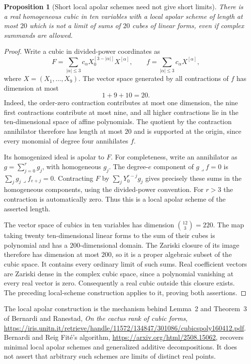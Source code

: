\documentclass[11pt]{article}
\newtheorem{proposition}{Proposition}
\begin{document}
\begin{proposition}[Short local apolar schemes need not give short limits]
There is a real homogeneous cubic in ten variables with a local apolar
scheme of length at most $20$ which is not a limit of sums of $20$
cubes of linear forms, even if complex summands are allowed.
\end{proposition}
\begin{proof}
Write a cubic in divided-power coordinates as
\[
 F=\sum_{|\alpha|\le3}c_\alpha
       X_0^{[3-|\alpha|]}X^{[\alpha]},\qquad
 f=\sum_{|\alpha|\le3}c_\alpha X^{[\alpha]},
\]
where $X=(X_1,\ldots,X_9)$. The vector space generated by all
contractions of $f$ has dimension at most
\[
 1+9+10=20.
\]
Indeed, the order-zero contraction contributes at most one dimension,
the nine first contractions contribute at most nine, and all higher
contractions lie in the ten-dimensional space of affine polynomials.
The quotient by the contraction annihilator therefore has length at
most $20$ and is supported at the origin, since every monomial of
degree four annihilates $f$.

Its homogenized ideal is apolar to $F$. For completeness, write an
annihilator as $g=\sum_{j=0}^r g_j$, with homogeneous $g_j$. The
degree-$e$ component of $g\mathbin{\lrcorner} f=0$ is
$\sum_j g_j\mathbin{\lrcorner} f_{e+j}=0$.
Contracting $F$ by $\sum_jY_0^{r-j}g_j$ gives precisely these
sums in the homogeneous components, using the divided-power
convention. For $r>3$ the contraction is automatically zero.
Thus this is a local apolar scheme of the asserted length.

The vector space of cubics in ten variables has dimension
$\binom{12}{3}=220$. The map taking twenty ten-dimensional
linear forms to the sum of their cubes is polynomial and has a
$200$-dimensional domain. The Zariski closure of its image therefore
has dimension at most $200$, so it is a proper algebraic subset of
the cubic space. It contains every ordinary limit of such sums.
Real coefficient vectors are Zariski dense in the complex cubic
space, since a polynomial vanishing at every real vector is zero.
Consequently a real cubic outside this closure exists. The preceding
local-scheme construction applies to it, proving both assertions.
\end{proof}

The local apolar construction is the mechanism behind Lemma~2 and
Theorem~3 of Bernardi and Ranestad,
\emph{On the cactus rank of cubic forms},
\url{https://iris.unitn.it/retrieve/handle/11572/134847/301086/cubicspoly160412.pdf}.
Bernardi and Reig Fit\'e's algorithm,
\url{https://arxiv.org/html/2508.15062}, recovers minimal local apolar
schemes and generalized additive decompositions. It does not assert
that arbitrary such schemes are limits of distinct real points.
\end{document}

